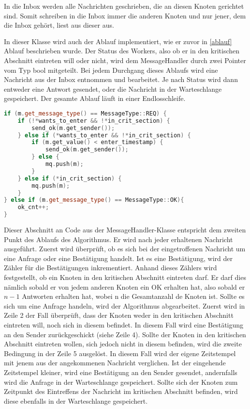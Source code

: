 \documentclass{article}
\begin{document}
In die Inbox werden alle Nachrichten geschrieben, die an diesen Knoten gerichtet sind. Somit schreiben in die Inbox immer die anderen Knoten und nur jener, dem die Inbox gehört, liest aus dieser aus.

In dieser Klasse wird auch der Ablauf implementiert, wie er zuvor in \ref{ablauf} Ablauf beschrieben wurde. Der Status des Workers, also ob er in den kritischen Abschnitt eintreten will oder nicht, wird dem MessageHandler durch zwei Pointer vom Typ bool mitgeteilt. Bei jedem Durchgang dieses Ablaufs wird eine Nachricht aus der Inbox entnommen und bearbeitet. Je nach Status wird dann entweder eine Antwort gesendet, oder die Nachricht in der Warteschlange gespeichert. Der gesamte Ablauf läuft in einer Endlosschleife.

\begin{minipage}{\linewidth}
\begin{lstlisting}[language=C++, caption=Bearbeitung einer Nachricht]
if (m.get_message_type() == MessageType::REQ) {
    if (!*wants_to_enter && !*in_crit_section) {
        send_ok(m.get_sender());
    } else if (*wants_to_enter && !*in_crit_section) {
        if (m.get_value() < enter_timestamp) {
            send_ok(m.get_sender());
        } else {
            mq.push(m);
        }
    } else if (*in_crit_section) {
        mq.push(m);
    }
} else if (m.get_message_type() == MessageType::OK){
    ok_cnt++;
}
\end{lstlisting}
\end{minipage}
Dieser Abschnitt an Code aus der MessageHandler-Klasse entspricht dem zweiten Punkt des Ablaufs des Algorithmus. Er wird nach jeder erhaltenen Nachricht ausgeführt. Zuerst wird überprüft, ob es sich bei der eingetroffenen Nachricht um eine Anfrage oder eine Bestätigung handelt. Ist es eine Bestätigung, wird der Zähler für die Bestätigungen inkrementiert. Anhand dieses Zählers wird festgestellt, ob ein Knoten in den kritischen Abschnitt eintreten darf. Er darf dies nämlich sobald er von jedem anderen Knoten ein OK erhalten hat, also sobald er \( n-1 \) Antworten erhalten hat, wobei n die Gesamtanzahl de Knoten ist. Sollte es sich um eine Anfrage handeln, wird der Algorithmus abgearbeitet. Zuerst wird in Zeile 2 der Fall überprüft, dass der Knoten weder in den kritischen Abschnitt eintreten will, noch sich in diesem befindet. In diesem Fall wird eine Bestätigung an den Sender zurückgeschickt (siehe Zeile 4). Sollte der Knoten in den kritischen Abschnitt eintreten wollen, sich jedoch nicht in diesem befinden, wird die zweite Bedingung in der Zeile 5 ausgelöst. In diesem Fall wird der eigene Zeitstempel mit jenem aus der angekommenen Nachricht verglichen. Ist der eingehende Zeitstempel kleiner, wird eine Bestätigung an den Sender gesendet, andernfalls wird die Anfrage in der Warteschlange gespeichert. Sollte sich der Knoten zum Zeitpunkt des Eintreffens der Nachricht im kritischen Abschnitt befinden, wird diese ebenfalls in der Warteschlange gespeichert.
\end{document}
